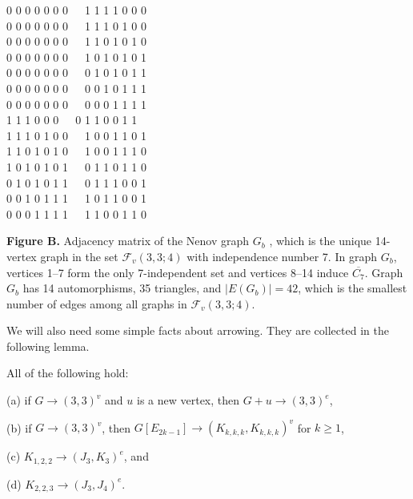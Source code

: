 \eject
\medskip
\begin{center}
{\small
0 0 0 0 0 0 0\ \ \ 1 1 1 1 0 0 0\\ 
0 0 0 0 0 0 0\ \ \ 1 1 1 0 1 0 0\\
0 0 0 0 0 0 0\ \ \ 1 1 0 1 0 1 0\\
0 0 0 0 0 0 0\ \ \ 1 0 1 0 1 0 1\\
0 0 0 0 0 0 0\ \ \ 0 1 0 1 0 1 1\\
0 0 0 0 0 0 0\ \ \ 0 0 1 0 1 1 1\\
0 0 0 0 0 0 0\ \ \ 0 0 0 1 1 1 1\\

 1 1 1 0 0 0\ \ \ 0 1 1 0 0 1 1\\
1 1 1 0 1 0 0\ \ \ 1 0 0 1 1 0 1\\
1 1 0 1 0 1 0\ \ \ 1 0 0 1 1 1 0\\
1 0 1 0 1 0 1\ \ \ 0 1 1 0 1 1 0\\
0 1 0 1 0 1 1\ \ \ 0 1 1 1 0 0 1\\
0 0 1 0 1 1 1\ \ \ 1 0 1 1 0 0 1\\
0 0 0 1 1 1 1\ \ \ 1 1 0 0 1 1 0\\
}
\end{center}

\medskip
\begingroup\leftskip=15pt\rightskip=15pt
\noindent
{\small
{\bf Figure B.} Adjacency matrix of the Nenov
graph $G_b$ \cite{Nenov81},
which is the unique 14-vertex graph
in the set $\mathcal{F}_v(3,3;4)$
with independence number 7.
In graph $G_b$, vertices 1--7 form
the only 7-independent set and vertices 8--14
induce $\overline{C_7}$.
Graph $G_b$ has 14 automorphisms,
35 triangles, and $|E(G_b)|=42$,
which is the smallest number of edges
among all graphs in $\mathcal{F}_v(3,3;4)$.
}
\par\endgroup

\bigskip
We will also need some simple facts about arrowing.
They are collected in the following lemma.

\smallskip
\begin{lemma} \label{miscarr}
All of the following hold:

\smallskip
\noindent
{\rm (a)}
if $G\rightarrow (3,3)^v$ and $u$ is a new vertex,
then $G+u \rightarrow (3,3)^e$,

\smallskip
\noindent
{\rm (b)}
if $G\rightarrow (3,3)^v$, then
$G[E_{2k-1}] \rightarrow (K_{k,k,k},K_{k,k,k})^v$ for $k \ge 1$,

\smallskip
\noindent
{\rm (c)}
$K_{1,2,2} \rightarrow (J_3,K_3)^e$, and

\smallskip
\noindent
{\rm (d)}
$K_{2,2,3} \rightarrow (J_3,J_4)^e$.
\end{lemma}

